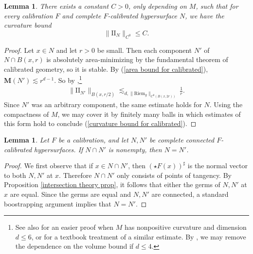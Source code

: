 \documentclass[reqno,11pt]{amsart}
\newcommand{\Two}{\mathrm{I\!I}}
\newcommand{\Riem}{\mathrm{Riem}}
\newcommand{\Mass}{\mathbf M}
\newtheorem{lemma}[theorem]{Lemma}
\theoremstyle{definition}
\numberwithin{equation}{section}
\begin{document}
\begin{lemma}
There exists a constant $C > 0$, only depending on $M$, such that for every calibration $F$ and complete $F$-calibrated hypersurface $N$, we have the curvature bound
\begin{equation}\label{curvature bound for calibrated}
\|\Two_N\|_{C^0} \leq C.
\end{equation}
\end{lemma}
\begin{proof}
Let $x \in N$ and let $r > 0$ be small.
Then each component $N'$ of $N \cap B(x, r)$ is absolutely area-minimizing by the fundamental theorem of calibrated geometry, so it is stable.
By (\ref{area bound for calibrated}), $\Mass(N') \lesssim r^{d - 1}$.
So by \cite[pg785, Corollary 1]{Schoen81},\footnote{See also \cite[Theorem 3]{Schoen75} for an easier proof when $M$ has nonpositive curvature and dimension $d \leq 6$, or \cite[Chapter 2, \S\S4-5]{colding2011course} for a textbook treatment of a similar estimate. By \cite[Lemma 2.4]{chodosh2022complete}, we may remove the dependence on the volume bound if $d \leq 4$.}
\begin{align*}
\|\Two_{N'}\|_{B(x, r/2)} \lesssim_{d, \|\Riem_g\|_{C^0(B(x, 2r))}} \frac{1}{r}.
\end{align*}
Since $N'$ was an arbitrary component, the same estimate holds for $N$.
Using the compactness of $M$, we may cover it by finitely many balls in which estimates of this form hold to conclude (\ref{curvature bound for calibrated}).
\end{proof}

\begin{lemma}\label{calibrated implies disjoint}
Let $F$ be a calibration, and let $N, N'$ be complete connected $F$-calibrated hypersurfaces.
If $N \cap N'$ is nonempty, then $N = N'$.
\end{lemma}
\begin{proof}
We first observe that if $x \in N \cap N'$, then $(\star F(x))^\sharp$ is the normal vector to both $N, N'$ at $x$.
Therefore $N \cap N'$ only consists of points of tangency.
By Proposition \ref{intersection theory prop}, it follows that either the germs of $N, N'$ at $x$ are equal.
Since the germs are equal and $N, N'$ are connected, a standard boostrapping argument implies that $N = N'$.
\end{proof}
\end{document}
